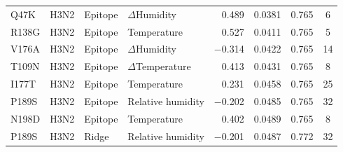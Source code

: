 \documentclass[11pt, a4paper]{article}
\begin{document}
\begin{longtable}{llllrccc}
        Q47K & H3N2 & Epitope & $\Delta$Humidity & 0.489 & 0.0381 & 0.765 & 6 \\
        R138G & H3N2 & Epitope & Temperature & 0.527 & 0.0411 & 0.765 & 5 \\
        V176A & H3N2 & Epitope & $\Delta$Humidity & $-$0.314 & 0.0422 & 0.765 & 14 \\
        T109N & H3N2 & Epitope & $\Delta$Temperature & 0.413 & 0.0431 & 0.765 & 8 \\
        I177T & H3N2 & Epitope & Temperature & 0.231 & 0.0458 & 0.765 & 25 \\
        P189S & H3N2 & Epitope & Relative humidity & $-$0.202 & 0.0485 & 0.765 & 32 \\
        N198D & H3N2 & Epitope & Temperature & 0.402 & 0.0489 & 0.765 & 8 \\
        P189S & H3N2 & Ridge & Relative humidity & $-$0.201 & 0.0487 & 0.772 & 32 \\
\end{longtable}
\end{document}
